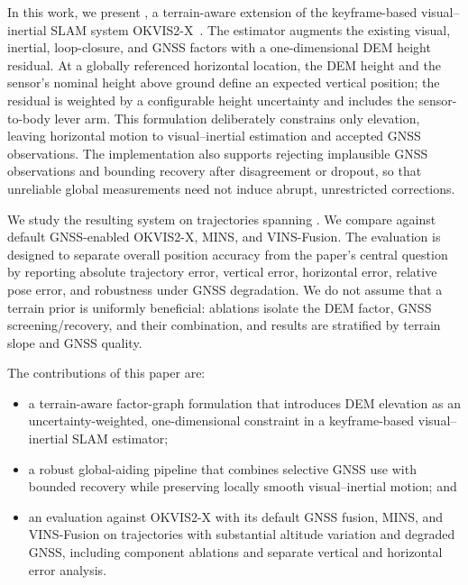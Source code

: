 In this work, we present \method{}, a terrain-aware extension of the
keyframe-based visual--inertial SLAM system OKVIS2-X~\cite{boche2025okvis2x}.
The estimator augments the existing visual, inertial, loop-closure, and GNSS
factors with a one-dimensional DEM height residual. At a globally referenced
horizontal location, the DEM height and the sensor's nominal height above
ground define an expected vertical position; the residual is weighted by a
configurable height uncertainty and includes the sensor-to-body lever arm. This
formulation deliberately constrains only elevation, leaving horizontal motion
to visual--inertial estimation and accepted GNSS observations. The
implementation also supports rejecting implausible GNSS observations and
bounding recovery after disagreement or dropout, so that unreliable global
measurements need not induce abrupt, unrestricted corrections.

We study the resulting system on \datasetnames{} trajectories spanning
. We compare against default GNSS-enabled OKVIS2-X, MINS,
and VINS-Fusion. The evaluation is designed to separate overall position
accuracy from the paper's central question by reporting absolute trajectory
error, vertical error, horizontal error, relative pose error, and robustness
under  GNSS degradation. We do
not assume that a terrain prior is uniformly beneficial: ablations isolate the
DEM factor, GNSS screening/recovery, and their combination, and results are
stratified by terrain slope and GNSS quality.

The contributions of this paper are:
\begin{itemize}
  \item a terrain-aware factor-graph formulation that introduces DEM elevation
        as an uncertainty-weighted, one-dimensional constraint in a
        keyframe-based visual--inertial SLAM estimator;
  \item a robust global-aiding pipeline that combines selective GNSS use with
        bounded recovery while preserving locally smooth visual--inertial
        motion; and
  \item an evaluation against OKVIS2-X with its default GNSS fusion, MINS, and
        VINS-Fusion on trajectories with substantial altitude variation and
        degraded GNSS, including component ablations and separate vertical and
        horizontal error analysis.
\end{itemize}

